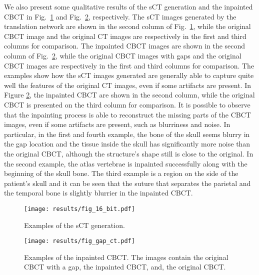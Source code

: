 We also present some qualitative results of the sCT generation and the inpainted CBCT in Fig.~\ref{fig:8bit_pix2pix} and Fig.~\ref{fig_gap_ct}, respectively.
The sCT images generated by the translation network are shown in the second column of Fig.~\ref{fig:8bit_pix2pix}, while the original CBCT image and the original CT images are respectively in the first and third columns for comparison.
The inpainted CBCT images are shown in the second column of Fig.~\ref{fig_gap_ct}, while the original CBCT images with gaps and the original CBCT images are respectively in the first and third columns for comparison.
The examples show how the sCT images generated are generally able to capture quite well the features of the original CT images, even if some artifacts are present.
In Figure \ref{fig_gap_ct}, the inpainted CBCT are shown in the second column, while the original CBCT is presented on the third column for comparison. 
It is possible to observe that the inpainting process is able to reconstruct the missing parts of the CBCT images, even if some artifacts are present, such as blurriness and noise.
In particular, in the first and fourth example, the bone of the skull seems blurry in the gap location and the tissue inside the skull has significantly more noise than the original CBCT, although the structure's shape still is close to the original. 
In the second example, the atlas vertebrae is inpainted successfully along with the beginning of the skull bone. 
The third example is a region on the side of the patient's skull and it can be seen that the suture that separates the parietal and the temporal bone is slightly blurrier in the inpainted CBCT.

\begin{figure}
	\centering
		\texttt{[image: results/fig\_16\_bit.pdf]}
	\caption{Examples of the sCT generation.}
	\label{fig:8bit_pix2pix}
\end{figure}

\begin{figure}
	\centering
		\texttt{[image: results/fig\_gap\_ct.pdf]}
	\caption{Examples of the inpainted CBCT. The images contain the original CBCT with a gap, the inpainted CBCT, and, the original CBCT.}
	\label{fig_gap_ct}
\end{figure}